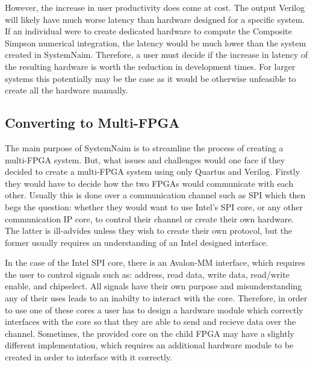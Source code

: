 However, the increase in user productivity does come at cost. The output Verilog will likely have much worse latency than hardware designed for a specific system. If an individual were to create dedicated hardware to compute the Composite Simpson numerical integration, the latency would be much lower than the system created in SystemNaim. Therefore, a user must decide if the increase in latency of the resulting hardware is worth the reduction in development times. For larger systems this potentially may be the case as it would be otherwise unfeasible to create all the hardware manually.

\subsection{Converting to Multi-FPGA}

The main purpose of SystemNaim is to streamline the process of creating a multi-FPGA system. But, what issues and challenges would one face if they decided to create a multi-FPGA system using only Quartus and Verilog. Firstly they would have to decide how the two FPGAs would communicate with each other. Usually this is done over a communication channel such as SPI which then begs the question: whether they would want to use Intel's SPI core, or any other communication IP core, to control their channel or create their own hardware. The latter is ill-advides unless they wish to create their own protocol, but the former usually requires an understanding of an Intel designed interface.

In the case of the Intel SPI core, there is an Avalon-MM interface, which requires the user to control signals such as: address, read data, write data, read/write enable, and chipselect. All signals have their own purpose and misunderstanding any of their uses leads to an inabilty to interact with the core. Therefore, in order to use one of these cores a user has to design a hardware module which correctly interfaces with the core so that they are able to send and recieve data over the channel. Sometimes, the provided core on the child FPGA may have a slightly different implementation, which requires an additional hardware module to be created in order to interface with it correctly.

